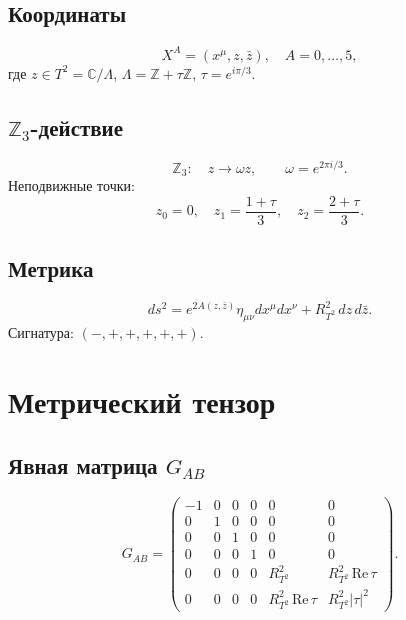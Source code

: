 \documentclass[11pt,letterpaper]{article}
\begin{document}
\subsection{Координаты}
\begin{equation}
X^A = (x^\mu, z, \bar{z}), \quad A = 0, \dots, 5,
\end{equation}
где $z \in T^2 = \mathbb{C}/\Lambda$, $\Lambda = \mathbb{Z} + \tau\mathbb{Z}$, $\tau = e^{i\pi/3}$.

\subsection{$\mathbb{Z}_3$-действие}
\begin{equation}
\mathbb{Z}_3: \quad z \to \omega z, \qquad \omega = e^{2\pi i/3} .
\end{equation}
Неподвижные точки:
\begin{equation}
z_0 = 0, \quad z_1 = \frac{1+\tau}{3}, \quad z_2 = \frac{2+\tau}{3} .
\end{equation}

\subsection{Метрика}
\begin{equation}
ds^2 = e^{2A(z,\bar{z})} \eta_{\mu\nu} dx^\mu dx^\nu + R_{T^2}^2 \, dz \, d\bar{z} .
\end{equation}
Сигнатура: $(-,+,+,+,+,+)$.

\section{Метрический тензор}

\subsection{Явная матрица $G_{AB}$}
\begin{equation}
G_{AB} =
\begin{pmatrix}
-1 & 0 & 0 & 0 & 0 & 0 \\
0 & 1 & 0 & 0 & 0 & 0 \\
0 & 0 & 1 & 0 & 0 & 0 \\
0 & 0 & 0 & 1 & 0 & 0 \\
0 & 0 & 0 & 0 & R_{T^2}^2 & R_{T^2}^2 \,\mathrm{Re}\,\tau \\
0 & 0 & 0 & 0 & R_{T^2}^2 \,\mathrm{Re}\,\tau & R_{T^2}^2 |\tau|^2
\end{pmatrix}.
\end{equation}
\end{document}
